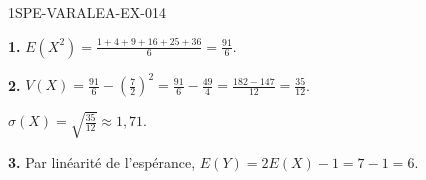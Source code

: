 \begin{corrige}{1SPE-VARALEA-EX-014}

\textbf{1.} $E(X^2) = \frac{1+4+9+16+25+36}{6} = \frac{91}{6}$.

\medskip
\textbf{2.} $V(X) = \frac{91}{6} - \left(\frac{7}{2}\right)^2 = \frac{91}{6} - \frac{49}{4} = \frac{182-147}{12} = \frac{35}{12}$.

$\sigma(X) = \sqrt{\frac{35}{12}} \approx 1{,}71$.

\medskip
\textbf{3.} Par linéarité de l'espérance,
$E(Y) = 2E(X)-1 = 7-1 = 6$.

\end{corrige}
